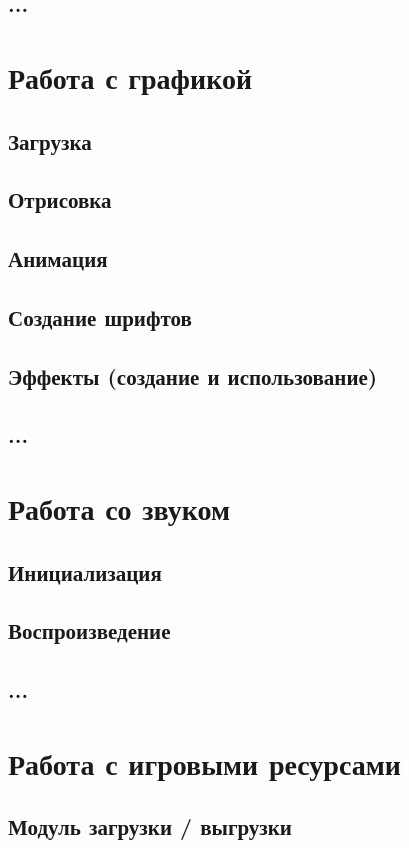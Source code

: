 \section{...}

\chapter{Работа с графикой} %
\section{Загрузка}
\section{Отрисовка}
\section{Анимация}
\section{Создание шрифтов}
\section{Эффекты (создание и использование)}
\section{...}

\chapter{Работа со звуком} %
\section{Инициализация}
\section{Воспроизведение}
\section{...}

\chapter{Работа с игровыми ресурсами}
\section{Модуль загрузки / выгрузки}
